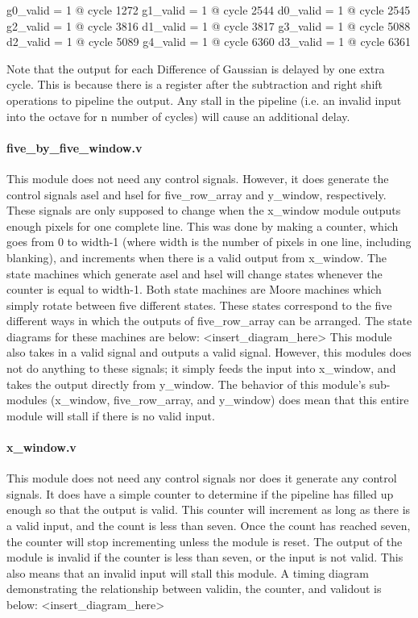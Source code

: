 \documentclass[12pt]{article}
\begin{document}
g0\_valid = 1 @ cycle 1272
g1\_valid = 1 @ cycle 2544
d0\_valid = 1 @ cycle 2545
g2\_valid = 1 @ cycle 3816
d1\_valid = 1 @ cycle 3817
g3\_valid = 1 @ cycle 5088
d2\_valid = 1 @ cycle 5089
g4\_valid = 1 @ cycle 6360
d3\_valid = 1 @ cycle 6361

Note that the output for each Difference of Gaussian is delayed by one extra cycle. This is because there is a register after the subtraction and right shift operations to pipeline the output. Any stall in the pipeline (i.e. an invalid input into the octave for n number of cycles) will cause an additional delay.

\paragraph{five\_by\_five\_window.v}
This module does not need any control signals. However, it does generate the 
control signals asel and hsel for five\_row\_array and y\_window, respectively. 
These signals are only supposed to change when the x\_window module outputs 
enough pixels for one complete line. This was done by making a counter, which 
goes from 0 to width-1 (where width is the number of pixels in one line, 
including blanking), and increments when there is a valid output from x\_window. 
The state machines which generate asel and hsel will change states whenever the 
counter is equal to width-1. Both state machines are Moore machines which simply 
rotate between five different states. These states correspond to the five 
different ways in which the outputs of five\_row\_array can be arranged. The state 
diagrams for these machines are below: <insert\_diagram\_here>
This module also takes in a valid signal and outputs a valid signal. However, 
this modules does not do anything to these signals; it simply feeds the input 
into x\_window, and takes the output directly from y\_window. The behavior of this 
module's sub-modules (x\_window, five\_row\_array, and y\_window) does mean that 
this entire module will stall if there is no valid input.

\paragraph{x\_window.v}
This module does not need any control signals nor does it generate any control 
signals. It does have a simple counter to determine if the pipeline has filled 
up enough so that the output is valid. This counter will increment as long as 
there is a valid input, and the count is less than seven. Once the count has 
reached seven, the counter will stop incrementing unless the module is reset. 
The output of the module is invalid if the counter is less than seven, or the 
input is not valid. This also means that an invalid input will stall this 
module. A timing diagram demonstrating the relationship between validin, the 
counter, and validout is below: <insert\_diagram\_here>
\end{document}
